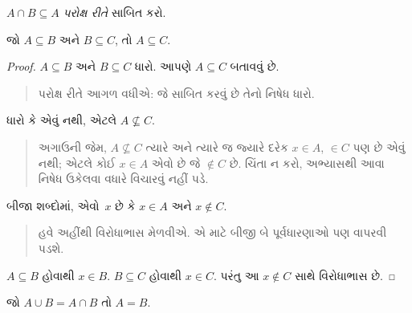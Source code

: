 \begin{prob}
$A \cap B \subseteq A$ \emph{પરોક્ષ રીતે} સાબિત કરો.
\end{prob}

\begin{prop}
જો $A \subseteq B$ અને $B \subseteq C$, તો $A \subseteq C$.
\end{prop}

\begin{proof}
  $A \subseteq B$ અને $B \subseteq C$ ધારો. આપણે $A
  \subseteq C$ બતાવવું છે.
  \begin{quote}
    પરોક્ષ રીતે આગળ વધીએ: જે સાબિત કરવું છે તેનો નિષેધ ધારો.
  \end{quote}
  ધારો કે એવું નથી, એટલે $A \nsubseteq C$.
  \begin{quote}
    અગાઉની જેમ, $A \nsubseteq C$ ત્યારે અને ત્યારે જ જ્યારે
    દરેક $x \in A$, $\in C$ પણ છે એવું નથી; એટલે કોઈ
    $x \in A$ એવો છે જે $\notin C$ છે. ચિંતા ન કરો,
    અભ્યાસથી આવા નિષેધ ઉકેલવા વધારે વિચારવું નહીં પડે.
  \end{quote}
  બીજા શબ્દોમાં, એવો~$x$ છે કે $x \in A$ અને $x \notin C$.
  \begin{quote}
    હવે અહીંથી વિરોધાભાસ મેળવીએ. એ માટે બીજી બે પૂર્વધારણાઓ
    પણ વાપરવી પડશે.
  \end{quote}
  $A \subseteq B$ હોવાથી $x \in B$. $B \subseteq C$ હોવાથી
  $x \in
  C$. પરંતુ આ $x \notin C$ સાથે વિરોધાભાસ છે.
\end{proof}

\begin{prop}
જો $A \cup B = A \cap B$ તો $A = B$.
\end{prop}

